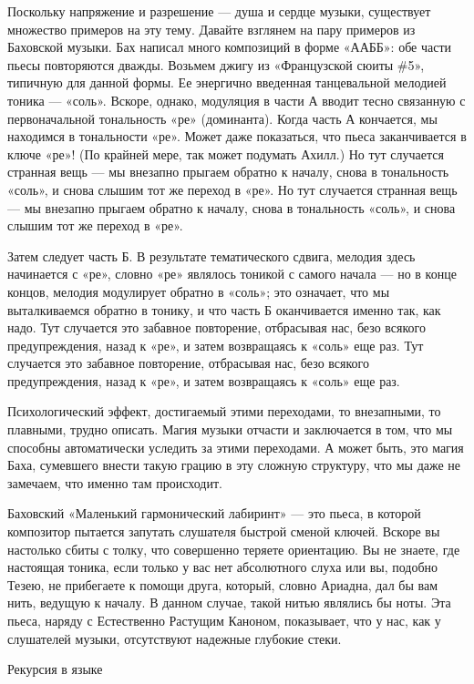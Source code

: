 Поскольку напряжение и разрешение --- душа и сердце музыки, существует множество примеров на эту тему. Давайте взглянем на пару примеров из Баховской музыки. Бах написал много композиций в форме «ААББ»: обе части пьесы повторяются дважды. Возьмем джигу из «Французской сюиты \#5», типичную для данной формы. Ее энергично введенная танцевальной мелодией тоника --- «соль». Вскоре, однако, модуляция в части А вводит тесно связанную с первоначальной тональность «ре» (доминанта). Когда часть А кончается, мы находимся в тональности «ре». Может даже показаться, что пьеса заканчивается в ключе «ре»! (По крайней мере, так может подумать Ахилл.) Но тут случается странная вещь --- мы внезапно прыгаем обратно к началу, снова в тональность «соль», и снова слышим тот же переход в «ре». Но тут случается странная вещь --- мы внезапно прыгаем обратно к началу, снова в тональность «соль», и снова слышим тот же переход в «ре».

Затем следует часть Б. В результате тематического сдвига, мелодия здесь начинается с «ре», словно «ре» являлось тоникой с самого начала --- но в конце концов, мелодия модулирует обратно в «соль»; это означает, что мы выталкиваемся обратно в тонику, и что часть Б оканчивается именно так, как надо. Тут случается это забавное повторение, отбрасывая нас, безо всякого предупреждения, назад к «ре», и затем возвращаясь к «соль» еще раз. Тут случается это забавное повторение, отбрасывая нас, безо всякого предупреждения, назад к «ре», и затем возвращаясь к «соль» еще раз.

Психологический эффект, достигаемый этими переходами, то внезапными, то плавными, трудно описать. Магия музыки отчасти и заключается в том, что мы способны автоматически уследить за этими переходами. А может быть, это магия Баха, сумевшего внести такую грацию в эту сложную структуру, что мы даже не замечаем, что именно там происходит.

Баховский «Маленький гармонический лабиринт» --- это пьеса, в которой композитор пытается запутать слушателя быстрой сменой ключей. Вскоре вы настолько сбиты с толку, что совершенно теряете ориентацию. Вы не знаете, где настоящая тоника, если только у вас нет абсолютного слуха или вы, подобно Тезею, не прибегаете к помощи друга, который, словно Ариадна, дал бы вам нить, ведущую к началу. В данном случае, такой нитью являлись бы ноты. Эта пьеса, наряду с Естественно Растущим Каноном, показывает, что у нас, как у слушателей музыки, отсутствуют надежные глубокие стеки.

Рекурсия в языке

